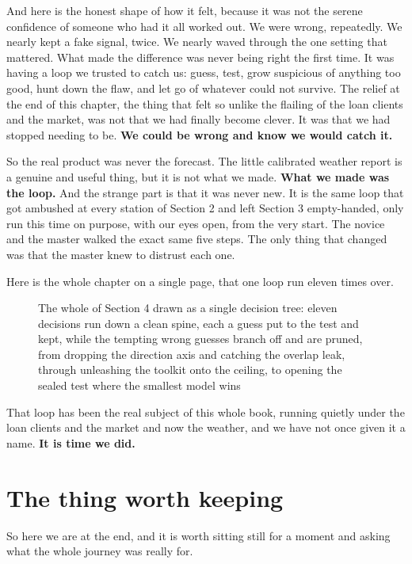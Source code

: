 \documentclass[11pt]{article} %
\begin{document}
And here is the honest shape of how it felt, because it was not the serene confidence of someone who had it all worked out. We were wrong, repeatedly. We nearly kept a fake signal, twice. We nearly waved through the one setting that mattered. What made the difference was never being right the first time. It was having a loop we trusted to catch us: guess, test, grow suspicious of anything too good, hunt down the flaw, and let go of whatever could not survive. The relief at the end of this chapter, the thing that felt so unlike the flailing of the loan clients and the market, was not that we had finally become clever. It was that we had stopped needing to be. \textbf{We could be wrong and know we would catch it.}

So the real product was never the forecast. The little calibrated weather report is a genuine and useful thing, but it is not what we made. \textbf{What we made was the loop.} And the strange part is that it was never new. It is the same loop that got ambushed at every station of Section 2 and left Section 3 empty-handed, only run this time on purpose, with our eyes open, from the very start. The novice and the master walked the exact same five steps. The only thing that changed was that the master knew to distrust each one.

Here is the whole chapter on a single page, that one loop run eleven times over.

\begin{figure}[htbp]
\centering

\caption{The whole of Section 4 drawn as a single decision tree: eleven decisions run down a clean spine, each a guess put to the test and kept, while the tempting wrong guesses branch off and are pruned, from dropping the direction axis and catching the overlap leak, through unleashing the toolkit onto the ceiling, to opening the sealed test where the smallest model wins}
\end{figure}


That loop has been the real subject of this whole book, running quietly under the loan clients and the market and now the weather, and we have not once given it a name. \textbf{It is time we did.}


\section{The thing worth keeping}


So here we are at the end, and it is worth sitting still for a moment and asking what the whole journey was really for.
\end{document}
